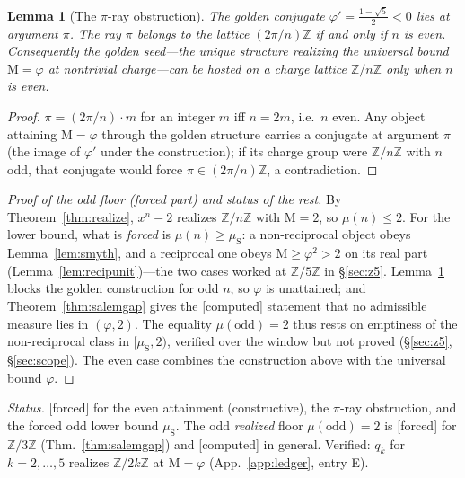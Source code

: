 \documentclass[11pt]{article}
\newtheorem{lemma}[theorem]{Lemma}
\theoremstyle{definition}
\theoremstyle{remark}
\newcommand{\Mah}{\mathrm{M}}
\newcommand{\Z}{\mathbb{Z}}
\newcommand{\gold}{\varphi}
\newcommand{\Zmod}[1]{\Z/#1\Z}
\newcommand{\status}[1]{{\small\textsf{[#1]}}}
\newcommand{\forced}{\status{forced}}
\newcommand{\computed}{\status{computed}}
\newcommand{\muS}{\mu_{\mathrm{S}}}
\begin{document}
\begin{lemma}[The $\pi$-ray obstruction]\label{lem:pi}
The golden conjugate $\gold'=\tfrac{1-\sqrt5}{2}<0$ lies at argument $\pi$. The ray $\pi$
belongs to the lattice $(2\pi/n)\Z$ if and only if $n$ is even. Consequently the golden
seed---the unique structure realizing the universal bound $\Mah=\gold$ at nontrivial
charge---can be hosted on a charge lattice $\Zmod n$ only when $n$ is even.
\end{lemma}
\begin{proof}
$\pi=(2\pi/n)\cdot m$ for an integer $m$ iff $n=2m$, i.e.\ $n$ even. Any object attaining
$\Mah=\gold$ through the golden structure carries a conjugate at argument $\pi$ (the image of
$\gold'$ under the construction); if its charge group were $\Zmod n$ with $n$ odd, that
conjugate would force $\pi\in(2\pi/n)\Z$, a contradiction.
\end{proof}

\begin{proof}[Proof of the odd floor (forced part) and status of the rest]
By Theorem~\ref{thm:realize}, $x^{n}-2$ realizes $\Zmod n$ with $\Mah=2$, so $\mu(n)\le2$. For
the lower bound, what is \emph{forced} is $\mu(n)\ge\muS$: a non-reciprocal object obeys
Lemma~\ref{lem:smyth}, and a reciprocal one obeys $\Mah\ge\gold^{2}>2$ on its real part
(Lemma~\ref{lem:recipunit})---the two cases worked at $\Zmod5$ in \S\ref{sec:z5}.
Lemma~\ref{lem:pi} blocks the golden construction for odd $n$, so $\gold$ is unattained; and
Theorem~\ref{thm:salemgap} gives the \computed{} statement that no admissible measure lies in
$(\gold,2)$. The equality $\mu(\mathrm{odd})=2$ thus rests on emptiness of the non-reciprocal
class in $[\muS,2)$, verified over the window but not proved (\S\ref{sec:z5},\,\S\ref{sec:scope}).
The even case combines the construction above with the universal bound $\gold$.
\end{proof}

\noindent\emph{Status.} \forced{} for the even attainment (constructive), the $\pi$-ray
obstruction, and the forced odd lower bound $\muS$. The odd \emph{realized} floor
$\mu(\mathrm{odd})=2$ is \forced{} for $\Zmod3$ (Thm.~\ref{thm:salemgap}) and \computed{} in
general. Verified: $q_k$ for $k=2,\dots,5$ realizes $\Zmod{2k}$ at $\Mah=\gold$
(App.~\ref{app:ledger}, entry E).
\end{document}
